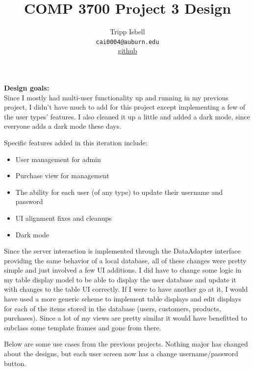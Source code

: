 \documentclass[notitlepage,11pt]{article}
\title{COMP 3700 Project 3 Design}
\author{Tripp Isbell\\
	\texttt{cai0004@auburn.edu}\\
	\href{https://github.com/Carbonationalism/COMP3700}{github}}
\date{}
\begin{document}
\maketitle

\textbf{Design goals:}\\
Since I mostly had multi-user functionality up and running in my previous project, I didn't have much to add for this project except implementing a few of the user types' features. I also cleaned it up a little and added a dark mode, since everyone adds a dark mode these days.

Specific features added in this iteration include:
\begin{itemize}
\item User management for admin
\item Purchase view for management
\item The ability for each user (of any type) to update their username and password
\item UI alignment fixes and cleanups
\item Dark mode
\end{itemize}

Since the server interaction is implemented through the DataAdapter interface providing the same behavior of a local database, all of these changes were pretty simple and just involved a few UI additions. I did have to change some logic in my table display model to be able to display the user database and update it with changes to the table UI correctly. If I were to have another go at it, I would have used a more generic scheme to implement table displays and edit displays for each of the items stored in the database (users, customers, products, purchases). Since a lot of my views are pretty similar it would have benefitted to subclass some template frames and gone from there. 

Below are some use cases from the previous projects. Nothing major has changed about the designs, but each user screen now has a change username/password button. 
\end{document}
